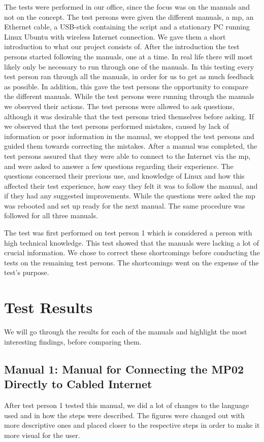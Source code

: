 The tests were performed in our office, since the focus was on the manuals and not on the concept. The test persons were given the different manuals, a \gls{mp}, an Ethernet cable, a USB-stick containing the script and a stationary PC running Linux Ubuntu with wireless Internet connection. We gave them a short introduction to what our project consists of. After the introduction the test persons started following the manuals, one at a time. In real life there will most likely only be necessary to run through one of the manuals. In this testing every test person ran through all the manuals, in order for us to get as much feedback as possible. In addition, this gave the test persons the opportunity to compare the different manuals. While the test persons were running through the manuals we observed their actions. The test persons were allowed to ask questions, although it was desirable that the test persons tried themselves before asking. If we observed that the test persons performed mistakes, caused by lack of information or poor information in the manual, we stopped the test persons and guided them towards correcting the mistakes. After a manual was completed, the test persons assured that they were able to connect to the Internet via the \gls{mp}, and were asked to answer a few questions regarding their experience. The questions concerned their previous use, and knowledge of Linux and how this affected their test experience, how easy they felt it was to follow the manual, and if they had any suggested improvements.
While the questions were asked the \gls{mp} was rebooted and set up ready for the next manual. The same procedure was followed for all three  manuals. 

The test was first performed on test person 1 which is considered a person with high technical knowledge. This test showed that the manuals were lacking a lot of crucial information. We chose to correct these shortcomings before conducting the tests on the remaining test persons. The shortcomings went on the expense of the test's purpose. 

\section{Test Results}
We will go through the results for each of the manuals and highlight the most interesting findings, before comparing them. 
 
\subsection{Manual 1: Manual for Connecting the MP02 Directly to Cabled Internet}
After test person 1 tested this manual, we did a lot of changes to the language used and in how the steps were described. The figures were changed out with more descriptive ones and placed closer to the respective steps in order to make it more visual for the user. 

